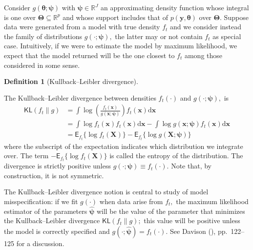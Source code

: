 \documentclass[
  11pt,
  letterpaper,
]{scrbook}
\theoremstyle{plain}
\theoremstyle{definition}
\theoremstyle{definition}
\theoremstyle{plain}
\theoremstyle{plain}
\theoremstyle{definition}
\newtheorem{definition}{Definition}[chapter]
\theoremstyle{remark}
\begin{document}
Consider \(g(\boldsymbol{\theta};\boldsymbol{\psi})\) with
\(\boldsymbol{\psi} \in \mathbb{R}^J\) an approximating density function
whose integral is one over
\(\boldsymbol{\Theta} \subseteq \mathbb{R}^p\) and whose support
includes that of \(p(\boldsymbol{y}, \boldsymbol{\theta})\) over
\(\boldsymbol{\Theta}.\) Suppose data were generated from a model with
true density \(f_t\) and we consider instead the family of distributions
\(g(\cdot; \boldsymbol{\psi}),\) the latter may or not contain \(f_t\)
as special case. Intuitively, if we were to estimate the model by
maximum likelihood, we expect that the model returned will be the one
closest to \(f_t\) among those considered in some sense.

\begin{definition}[Kullback--Leibler
divergence]\protect\hypertarget{def-kl-divergence}{}\label{def-kl-divergence}

The Kullback--Leibler divergence between densities \(f_t(\cdot)\) and
\(g(\cdot; \boldsymbol{\psi}),\) is \begin{align*}
\mathsf{KL}(f_t \parallel g) &=\int \log \left(\frac{f_t(\boldsymbol{x})}{g(\boldsymbol{x}; \boldsymbol{\psi})}\right) f_t(\boldsymbol{x}) \mathrm{d} \boldsymbol{x}\\
&= \int \log f_t(\boldsymbol{x}) f_t(\boldsymbol{x}) \mathrm{d} \boldsymbol{x} - \int \log g(\boldsymbol{x}; \boldsymbol{\psi}) f_t(\boldsymbol{x}) \mathrm{d} \boldsymbol{x}
\\ &= \mathsf{E}_{f_t}\{\log f_t(\boldsymbol{X})\} - \mathsf{E}_{f_t}\{\log g(\boldsymbol{X}; \boldsymbol{\psi})\}
\end{align*} where the subscript of the expectation indicates which
distribution we integrate over. The term
\(-\mathsf{E}_{f_t}\{\log f_t(\boldsymbol{X})\}\) is called the entropy
of the distribution. The divergence is strictly positive unless
\(g(\cdot; \boldsymbol{\psi}) \equiv f_t(\cdot).\) Note that, by
construction, it is not symmetric.

\end{definition}

The Kullback--Leibler divergence notion is central to study of model
misspecification: if we fit \(g(\cdot)\) when data arise from \(f_t,\)
the maximum likelihood estimator of the parameters
\(\widehat{\boldsymbol{\psi}}\) will be the value of the parameter that
minimizes the Kullback--Leibler divergence
\(\mathsf{KL}(f_t \parallel g);\) this value will be positive unless the
model is correctly specified and
\(g(\cdot; \widehat{\boldsymbol{\psi}}) = f_t(\cdot).\) See Davison
(), pp.~122--125 for a discussion.
\end{document}
